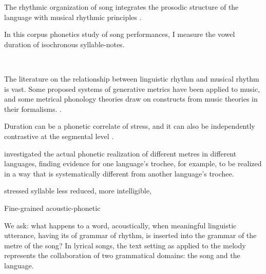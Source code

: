 The rhythmic organization of song integrates the prosodic structure of the language with musical rhythmic principles \citep{palmerLinguisticProsodyMusical1992}. 

In this corpus phonetics study of song performances, I measure the vowel duration of isochronous syllable-notes. 


\


The literature on the relationship between linguistic rhythm and musical rhythm is vast. Some proposed systems of generative metrics have been applied to music, and some metrical phonology theories draw on constructs from music theories in their formalisms. \citep{palmerLinguisticProsodyMusical1992,lerdahl1983overview,liberman1977stress}. 





Duration can be a phonetic correlate of stress, and it can also be independently contrastive at the segmental level \citep{lehistePhoneticsMetrics1992}. 







\citep{lehistePhoneticsMetrics1992} investigated the actual phonetic realization of different metres in different languages, finding evidence for one language's trochee, for example, to be realized in a way that is systematically different from another language's trochee. 

%

stressed syllable less reduced, more intelligible, 

Fine-grained acoustic-phonetic


We ask: what happens to a word, acoustically, when meaningful linguistic utterance, having its of grammar of rhythm, is inserted into the grammar of the metre of the song? 
In lyrical songs, the text setting as applied to the melody represents the collaboration of two grammatical domains: the song and the language. 

